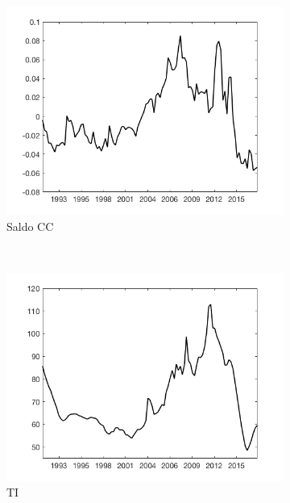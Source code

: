 \documentclass[12pt,letterpaper]{article}
\begin{document}
\begin{figure}
    \begin{subfigure}[b]{0.4\textwidth}
        \includegraphics[width=\textwidth]{fig9}
        \caption{Saldo CC}
    \end{subfigure}
    ~ %
   \begin{subfigure}[b]{0.4\textwidth}
       \includegraphics[width=\textwidth]{fig10}
        \caption{TI}
    \end{subfigure}
    \begin{subfigure}[b]{0.4\textwidth}

\end{subfigure}
\end{figure}
\end{document}
